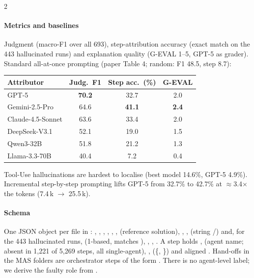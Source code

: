 \begin{multicols}{2}
\paragraph{Metrics and baselines} Judgment (macro-F1 over all 693), step-attribution accuracy (exact match on the 443 hallucinated runs) and explanation quality (G-EVAL 1--5, GPT-5 as grader). Standard all-at-once prompting (paper Table 4; random: F1 48.5, step 8.7):

\begin{center}\small
\begin{tabular}{@{}lccc@{}}\toprule
Attributor & Judg.\ F1 & Step acc.\ (\%) & G-EVAL\\\midrule
GPT-5 & \textbf{70.2} & 32.7 & 2.0\\
Gemini-2.5-Pro & 64.6 & \textbf{41.1} & \textbf{2.4}\\
Claude-4.5-Sonnet & 63.6 & 33.4 & 2.0\\
DeepSeek-V3.1 & 52.1 & 19.0 & 1.5\\
Qwen3-32B & 51.8 & 21.2 & 1.3\\
Llama-3.3-70B & 40.4 & 7.2 & 0.4\\\bottomrule
\end{tabular}
\end{center}
Tool-Use hallucinations are hardest to localise (best model 14.6\%, GPT-5 4.9\%). Incremental step-by-step prompting lifts GPT-5 from 32.7\% to 42.7\% at $\approx$3.4$\times$ the tokens (7.4\,k $\to$ 25.5\,k).

\paragraph{Schema} One JSON object per file in : , , , , , ,  (reference solution), , ,  (string /) and, for the 443 hallucinated runs,  (1-based, matches ), , , . A step holds ,  (agent name; absent in 1,221 of 5,269 steps, all single-agent), ,  (\{, \}) and aligned . Hand-offs in the MAS folders are orchestrator steps of the form . There is no agent-level label; we derive the faulty role from .
\end{multicols}

